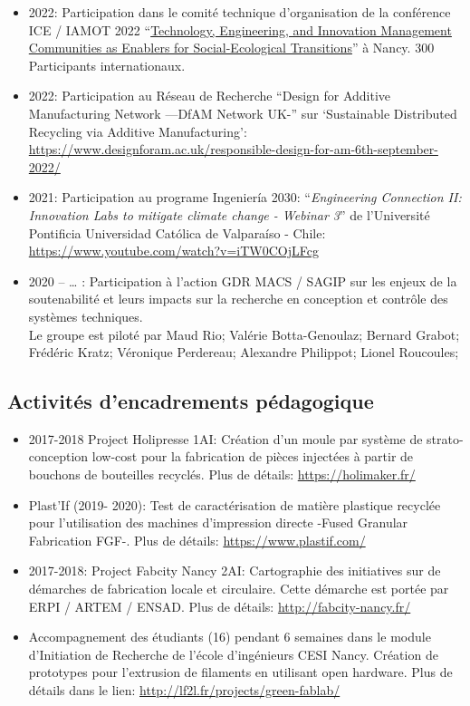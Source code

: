 \documentclass[
  11pt,
]{article}
\begin{document}
\begin{itemize}
\item
  2022: Participation dans le comité technique d'organisation de la
  conférence ICE / IAMOT 2022
  ``\href{https://ice-iamot-2022-conference.org/}{Technology,
  Engineering, and Innovation Management Communities as Enablers for
  Social-Ecological Transitions}'' à Nancy. 300 Participants
  internationaux.
\item
  2022: Participation au Réseau de Recherche ``Design for Additive
  Manufacturing Network ---DfAM Network UK-'' sur `Sustainable
  Distributed Recycling via Additive Manufacturing':
  \url{https://www.designforam.ac.uk/responsible-design-for-am-6th-september-2022/}
\item
  2021: Participation au programe Ingeniería 2030: ``\emph{Engineering
  Connection II: Innovation Labs to mitigate climate change - Webinar
  3}'' de l'Université Pontificia Universidad Católica de Valparaíso -
  Chile: \url{https://www.youtube.com/watch?v=iTW0COjLFcg}
\item
  2020 -- \ldots{} : Participation à l'action GDR MACS / SAGIP sur les
  enjeux de la soutenabilité et leurs impacts sur la recherche en
  conception et contrôle des systèmes techniques.\\
  Le groupe est piloté par Maud Rio; Valérie Botta-Genoulaz; Bernard
  Grabot; Frédéric Kratz; Véronique Perdereau; Alexandre Philippot;
  Lionel Roucoules;
\end{itemize}

\hypertarget{activituxe9s-dencadrements-puxe9dagogique}{%
\subsection{Activités d'encadrements
pédagogique}\label{activituxe9s-dencadrements-puxe9dagogique}}

\begin{itemize}
\item
  2017-2018 Project Holipresse 1AI: Création d'un moule par système de
  strato-conception low-cost pour la fabrication de pièces injectées à
  partir de bouchons de bouteilles recyclés. Plus de détails:
  \url{https://holimaker.fr/}
\item
  Plast'If (2019- 2020): Test de caractérisation de matière plastique
  recyclée pour l'utilisation des machines d'impression directe -Fused
  Granular Fabrication FGF-. Plus de détails:
  \url{https://www.plastif.com/}
\item
  2017-2018: Project Fabcity Nancy 2AI: Cartographie des initiatives sur
  de démarches de fabrication locale et circulaire. Cette démarche est
  portée par ERPI / ARTEM / ENSAD. Plus de détails:
  \url{http://fabcity-nancy.fr/}
\item
  Accompagnement des étudiants (16) pendant 6 semaines dans le module
  d'Initiation de Recherche de l'école d'ingénieurs CESI Nancy. Création
  de prototypes pour l'extrusion de filaments en utilisant open
  hardware. Plus de détails dans le lien:
  \url{http://lf2l.fr/projects/green-fablab/}
\end{itemize}
\end{document}
